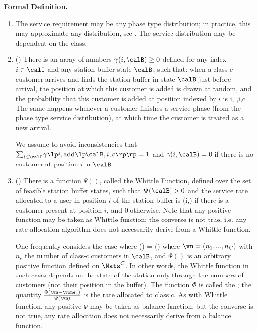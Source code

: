 \textbf{\sc Formal Definition.} \noitemsep
\begin{enumerate}
  \item The service requirement may be any phase type
      distribution; in practice, this may approximate any
      distribution, see . The service
      distribution may be dependent on the class.

    \item () There is an array of numbers
$\gamma(i,\calB)\geq 0$  defined for any index $i
\in \calI$ and any station buffer state $\calB$,
such that: when a class $c$ customer arrives and
finds the station buffer in state $\calB$ just
before arrival, the position at which this
customer is added is drawn at random, and the
probability that this customer is added at
position indexed by $i$ is
  \be
  \gamma\lp i, \lp \calB,i,c\rp\rp
 \label{eq-q-q-net-ins-hjkdf}
  \ee
The same happens whenever a customer finishes a
service phase (from the phase type service
distribution), at which time the customer is
treated as a new arrival.

We assume to avoid inconsistencies that $\sum_{i
\in \calI}\gamma\lp i, \mathrm{add}\lp
\calB,i,c\rp\rp=1$ and $\gamma(i,\calB)=0$ if
there is no customer
    at position $i$ in $\calB$.
    \item () There is a function
        $\Psi()$, called the Whittle Function, defined over
        the set of feasible station buffer states, such
        that $\Psi(\calB)> 0$ and the service
    rate allocated to a user in position $i$ of
    the station buffer is
    \be
    \gamma(i,\calB)
    {
    \Psi\lp \calB\rp
    }
    \label{eq-def-sr}
    \ee if there is a customer present at
    position $i$, and $0$ otherwise.
%
Note that any positive function may be taken as
Whittle function; the converse is not true, i.e.
any rate allocation algorithm does not
necessarily derive from a Whittle function.

One frequently considers the case where  \be
    \Psi(\calB) = \Phi(\vn) \ee where $\vn =(n_1,...,n_C)$
with $n_c$ the number of class-$c$ customers in $\calB$,
and $\Phi()$ is an arbitrary positive function defined on
$\Nats^C$. In other words, the Whittle function in such
cases depends on the state of the station only through the
numbers of customers (not their position in the buffer).
The function $\Phi$ is called the ;
the quantity $\frac{\Phi(\vn - \vone_c)}{\Phi(\vn)}$ is the
rate allocated to class $c$. As with Whittle function, any
positive $\Phi$ may be taken as balance function, but the
converse is not true, any rate allocation does not
necessarily derive from a balance function.
%



\end{enumerate}
